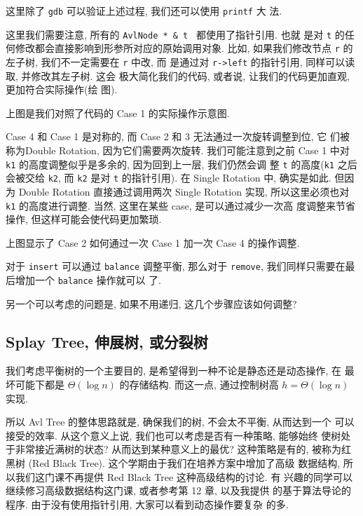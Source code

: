 \documentclass[a4paper]{ctexart}
\theoremstyle{definition}
\theoremstyle{definition}
\begin{document}
这里除了 \verb|gdb| 可以验证上述过程, 我们还可以使用 \verb|printf| 大
法.

这里我们需要注意, 所有的 \verb|AvlNode * & t | 都使用了指针引用. 也就
是对 \verb|t| 的任何修改都会直接影响到形参所对应的原始调用对象. 比如,
如果我们修改节点 \verb|r| 的左子树, 我们不一定需要在 \verb|r| 中改, 而
是通过对 \verb|r->left| 的指针引用, 同样可以读取, 并修改其左子树. 这会
极大简化我们的代码, 或者说, 让我们的代码更加直观, 更加符合实际操作(绘
图).


上图是我们对照了代码的 Case 1 的实际操作示意图.

Case 4 和 Case 1 是对称的, 而 Case 2 和 3 无法通过一次旋转调整到位, 它
们被称为Double Rotation, 因为它们需要两次旋转. 我们可能注意到之前 Case
1 中对 \verb|k1| 的高度调整似乎是多余的, 因为回到上一层, 我们仍然会调
整 \verb|t| 的高度(\verb|k1| 之后会被交给 \verb|k2|, 而 \verb|k2| 是对
\verb|t| 的指针引用). 在 Single Rotation 中, 确实是如此. 但因为 Double
Rotation 直接通过调用两次 Single Rotation 实现, 所以这里必须也对
\verb|k1| 的高度进行调整. 当然, 这里在某些 case, 是可以通过减少一次高
度调整来节省操作, 但这样可能会使代码更加繁琐.


上图显示了 Case 2 如何通过一次 Case 1 加一次 Case 4 的操作调整.

对于 \verb|insert| 可以通过 \verb|balance| 调整平衡, 那么对于
\verb|remove|, 我们同样只需要在最后增加一个 \verb|balance| 操作就可以
了. 

另一个可以考虑的问题是, 如果不用递归, 这几个步骤应该如何调整? 

\subsection{Splay Tree, 伸展树, 或分裂树}

我们考虑平衡树的一个主要目的, 是希望得到一种不论是静态还是动态操作, 在
最坏可能下都是 $\Theta(\log n)$ 的存储结构. 而这一点, 通过控制树高
$h = \Theta(\log n)$ 实现.

所以 Avl Tree 的整体思路就是, 确保我们的树, 不会太不平衡, 从而达到一个
可以接受的效率. 从这个意义上说, 我们也可以考虑是否有一种策略, 能够始终
使树处于非常接近满树的状态? 从而达到某种意义上的最优? 这种策略是有的,
被称为红黑树 (Red Black Tree). 这个学期由于我们在培养方案中增加了高级
数据结构, 所以我们这门课不再提供 Red Black Tree 这种高级结构的讨论. 有
兴趣的同学可以继续修习高级数据结构这门课, 或者参考第 12 章, 以及我提供
的基于算法导论的程序. 由于没有使用指针引用, 大家可以看到动态操作要复杂
的多.
\end{document}
